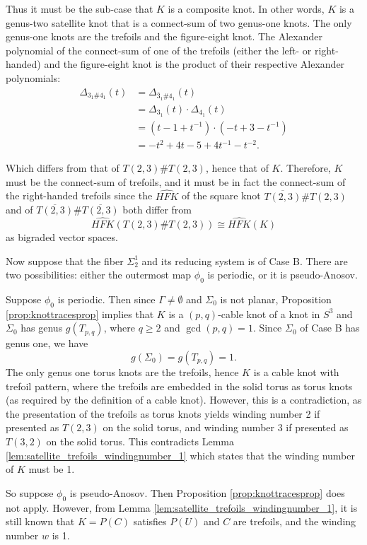 \begin{myproof}
    Thus it must be the sub-case that $K$ is a composite knot. In other words, $K$ is a genus-two satellite knot that is a connect-sum of two genus-one knots. The only genus-one knots are the trefoils and the figure-eight knot. The Alexander polynomial of the connect-sum of one of the trefoils (either the left- or right-handed) and the figure-eight knot is the product of their respective Alexander polynomials:
    \begin{align*}
        \Delta_{3_1 \# 4_1} (t)&= \Delta_{\bar{3}_1 \# 4_1}(t)\\
        &= \Delta_{3_1}(t) \cdot \Delta_{4_1}(t)\\
        &= (t - 1 + t^{-1})\cdot (-t +3 -t^{-1})\\
        &= -t^2 + 4t - 5 + 4t^{-1} - t^{-2}.
    \end{align*}

    Which differs from that of $T(2,3)\#T(2,3)$, hence that of $K$. Therefore, $K$ must be the connect-sum of trefoils, and it must be in fact the connect-sum of the right-handed trefoils since the $\widehat{HFK}$ of the square knot $\overline{T(2,3)}\# T(2,3)$ and of $\overline{T(2,3)} \# \overline{T(2,3)}$ both differ from
    \[
    \widehat{HFK}(T(2,3) \# T(2,3)) \cong \widehat{HFK}(K)
    \]
    as bigraded vector spaces.

    Now suppose that the fiber $\Sigma_2^1$ and its reducing system is of Case B. There are two possibilities: either the outermost map $\phi_0$ is periodic, or it is pseudo-Anosov.

    Suppose $\phi_0$ is periodic. Then since $\Gamma \neq \emptyset$ and $\Sigma_0$ is not planar, Proposition \ref{prop:knottracesprop} implies that $K$ is a $(p,q)$-cable knot of a knot in $S^3$ and $\Sigma_0$ has genus $g(T_{p,q})$, where $q\geq 2$ and $\gcd(p,q) = 1$. Since $\Sigma_0$ of Case B has genus one, we have
    \[
    g(\Sigma_0) = g(T_{p,q}) = 1.
    \]
    The only genus one torus knots are the trefoils, hence $K$ is a cable knot with trefoil pattern, where the trefoils are embedded in the solid torus as torus knots (as required by the definition of a cable knot). However, this is a contradiction, as the presentation of the trefoils as torus knots yields winding number 2 if presented as $T(2,3)$ on the solid torus, and winding number 3 if presented as $T(3,2)$ on the solid torus. This contradicts Lemma \ref{lem:satellite_trefoils_windingnumber_1} which states that the winding number of $K$ must be 1.

    So suppose $\phi_0$ is pseudo-Anosov. Then Proposition \ref{prop:knottracesprop} does not apply. However, from Lemma \ref{lem:satellite_trefoils_windingnumber_1}, it is still known that $K = P(C)$ satisfies $P(U)$ and $C$ are trefoils, and the winding number $w$ is 1.


\end{myproof}
